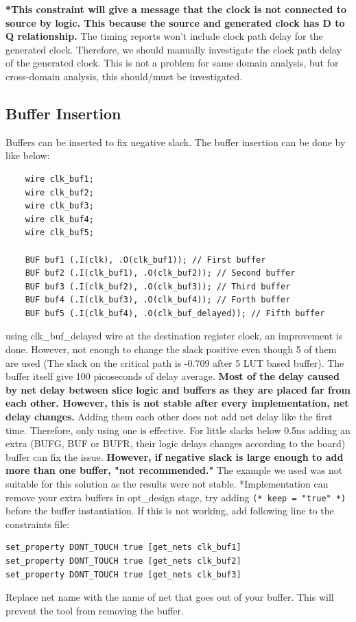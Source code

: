\documentclass{report}
\begin{document}
\textbf{*This constraint will give a message that the clock is not connected to source by logic. This because the source and generated clock has D to Q relationship.} The timing reports won't include clock path delay for the generated clock. Therefore, we should manually investigate the clock path delay of the generated clock. This is not a problem for same domain analysis, but for cross-domain analysis, this should/must be investigated. 

\subsection{Buffer Insertion}
Buffers can be inserted to fix negative slack. The buffer insertion can be done by like below:
\begin{verbatim}
    wire clk_buf1;
    wire clk_buf2;
    wire clk_buf3;
    wire clk_buf4;
    wire clk_buf5;

    BUF buf1 (.I(clk), .O(clk_buf1)); // First buffer
    BUF buf2 (.I(clk_buf1), .O(clk_buf2)); // Second buffer
    BUF buf3 (.I(clk_buf2), .O(clk_buf3)); // Third buffer
    BUF buf4 (.I(clk_buf3), .O(clk_buf4)); // Forth buffer
    BUF buf5 (.I(clk_buf4), .O(clk_buf_delayed)); // Fifth buffer
\end{verbatim}
using clk\_buf\_delayed wire at the destination register clock, an improvement is done. However, not enough to change the slack positive even though 5 of them are used (The slack on the critical path is -0.709 after 5 LUT based buffer). The buffer itself give 100 picoseconds of delay average. \textbf{Most of the delay caused by net delay between slice logic and buffers as they are placed far from each other. However, this is not stable after every implementation, net delay changes.} Adding them each other does not add net delay like the first time. Therefore, only using one is effective.
\bigbreak
For little slacks below 0.5ns adding an extra (BUFG, BUF or BUFR, their logic delays changes according to the board) buffer can fix the issue. \textbf{However, if negative slack is large enough to add more than one buffer, "not recommended."}
\bigbreak
The example we used was not suitable for this solution as the results were not stable.
\bigbreak
*Implementation can remove your extra buffers in opt\_design stage, try adding \texttt{(* keep = "true" *)} before the buffer instantiation. If this is not working, add following line to the constraints file:
\begin{verbatim}
set_property DONT_TOUCH true [get_nets clk_buf1]
set_property DONT_TOUCH true [get_nets clk_buf2]
set_property DONT_TOUCH true [get_nets clk_buf3]
\end{verbatim}
Replace net name with the name of net that goes out of your buffer. This will prevent the tool from removing the buffer.
\end{document}
